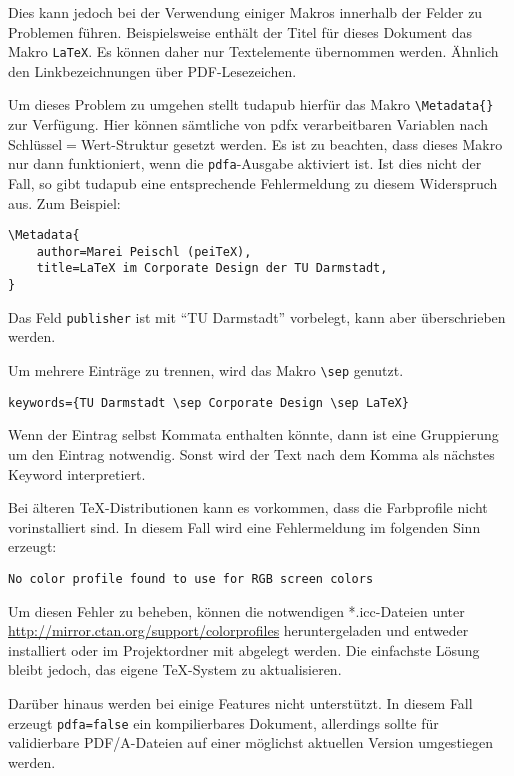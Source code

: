 \documentclass[
	ngerman,
	accentcolor=9c,%
	]{tudapub}
\let\code\texttt
\let\pck\textsf
\let\cls\textsf
\begin{document}
Dies kann jedoch bei der Verwendung einiger Makros innerhalb der Felder zu Problemen führen. Beispielsweise enthält der Titel für dieses Dokument das Makro \code{\LaTeX}. Es können daher nur Textelemente übernommen werden. Ähnlich den Linkbezeichnungen über PDF-Lesezeichen.

Um dieses Problem zu umgehen stellt \cls{tudapub} hierfür das Makro \code{\textbackslash{}Metadata\{\}} zur Verfügung. Hier können sämtliche von \pck{pdfx} verarbeitbaren Variablen nach Schlüssel$=$Wert-Struktur gesetzt werden. Es ist zu beachten, dass dieses Makro nur dann funktioniert, wenn die \code{pdfa}-Ausgabe aktiviert ist. Ist dies nicht der Fall, so gibt \cls{tudapub} eine entsprechende Fehlermeldung zu diesem Widerspruch aus.
Zum Beispiel:
\begin{verbatim}
\Metadata{
	author=Marei Peischl (peiTeX),
	title=LaTeX im Corporate Design der TU Darmstadt,
}
\end{verbatim}
Das Feld \code{publisher} ist mit \enquote{TU Darmstadt} vorbelegt, kann aber überschrieben werden.

Um mehrere Einträge zu trennen, wird das Makro \code{\textbackslash{}sep} genutzt.
\begin{verbatim}
keywords={TU Darmstadt \sep Corporate Design \sep LaTeX}
\end{verbatim}
Wenn der Eintrag selbst Kommata enthalten könnte, dann ist eine Gruppierung um den Eintrag notwendig. Sonst wird der Text nach dem Komma als nächstes Keyword interpretiert.


Bei älteren \TeX-Distributionen kann es vorkommen, dass die Farbprofile nicht vorinstalliert sind. In diesem Fall wird eine Fehlermeldung im folgenden Sinn erzeugt:
\begin{verbatim}
No color profile found to use for RGB screen colors
\end{verbatim}
Um diesen Fehler zu beheben, können die notwendigen *.icc-Dateien unter \url{http://mirror.ctan.org/support/colorprofiles} heruntergeladen und entweder installiert oder im Projektordner mit abgelegt werden. Die einfachste Lösung bleibt jedoch, das eigene \TeX-System zu aktualisieren.

Darüber hinaus werden bei  einige Features nicht unterstützt. In diesem Fall erzeugt \code{pdfa=false} ein kompilierbares Dokument, allerdings sollte für validierbare PDF/A-Dateien auf  einer möglichst aktuellen Version umgestiegen werden.
\end{document}
